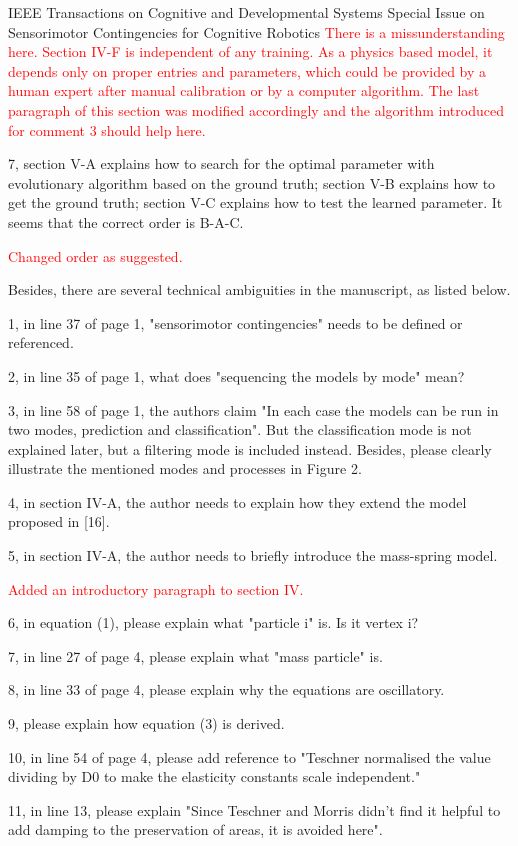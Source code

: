 \documentclass[a4paper,12pt]{letter}
\newcommand{\comment}[1]{\textcolor{red}{#1}}
\begin{document}
\begin{letter}{IEEE Transactions on Cognitive and Developmental Systems\newline
Special Issue on Sensorimotor Contingencies for Cognitive Robotics}
\comment{There is a missunderstanding here.  Section IV-F is independent of any training.  As a physics based model, it depends only on proper entries and parameters, which could be provided by a human expert after manual calibration or by a computer algorithm.  The last paragraph of this section was modified accordingly and the algorithm introduced for comment 3 should help here.}

7, section V-A explains how to search for the optimal parameter with evolutionary algorithm based on the ground truth; section V-B explains how to get the ground truth; section V-C explains how to test the learned parameter. It seems that the correct order is B-A-C.

\comment{Changed order as suggested.}

Besides, there are several technical ambiguities in the manuscript, as listed below. 

1, in line 37 of page 1, "sensorimotor contingencies" needs to be defined or referenced. 

2, in line 35 of page 1, what does "sequencing the models by mode" mean? 

3, in line 58 of page 1, the authors claim "In each case the models can be run in two modes, prediction and classification". But the classification mode is not explained later, but a filtering mode is included instead. Besides, please clearly illustrate the mentioned modes and processes in Figure 2. 

4, in section IV-A, the author needs to explain how they extend the model proposed in [16]. 

5, in section IV-A, the author needs to briefly introduce the mass-spring model.

\comment{Added an introductory paragraph to section IV.}

6, in equation (1), please explain what "particle i" is. Is it vertex i? 

7, in line 27 of page 4, please explain what "mass particle" is. 

8, in line 33 of page 4, please explain why the equations are oscillatory. 

9, please explain how equation (3) is derived. 

10, in line 54 of page 4, please add reference to "Teschner normalised the value dividing by D0 to make the elasticity constants scale independent." 

11, in line 13, please explain "Since Teschner and Morris didn’t find it helpful to add damping to the preservation of areas, it is avoided here". 


\end{letter}
\end{document}
